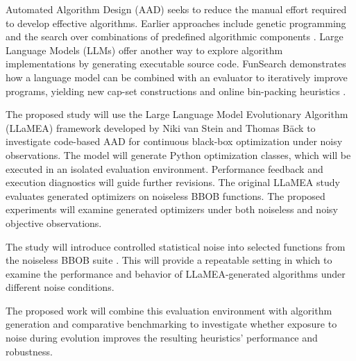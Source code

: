 Automated Algorithm Design (AAD) seeks to reduce the manual effort
required to develop effective algorithms. Earlier approaches include
genetic programming and the search over combinations of predefined
algorithmic components \cite{Burke2013,vanRijn2016}. Large Language
Models (LLMs) offer another way to explore algorithm implementations
by generating executable source code. FunSearch demonstrates how a
language model can be combined with an evaluator to iteratively improve
programs, yielding new cap-set constructions and online bin-packing
heuristics \cite{Romera2023}.

The proposed study will use the Large Language Model Evolutionary
Algorithm (LLaMEA) framework developed by Niki van Stein and Thomas
Bäck \cite{LLaMEA2024} to investigate code-based AAD for continuous
black-box optimization under noisy observations. The model will generate
Python optimization classes, which will be executed in an isolated
evaluation environment. Performance feedback and execution diagnostics
will guide further revisions. The original LLaMEA study evaluates
generated optimizers on noiseless BBOB functions. The proposed
experiments will examine generated optimizers under both noiseless and
noisy objective observations.

The study will introduce controlled statistical noise into selected
functions from the noiseless BBOB suite \cite{Hansen2009Noiseless}.
This will provide a repeatable setting in which to examine the
performance and behavior of LLaMEA-generated algorithms under different
noise conditions.

The proposed work will combine this evaluation environment with
algorithm generation and comparative benchmarking to investigate
whether exposure to noise during evolution improves the resulting
heuristics' performance and robustness.
